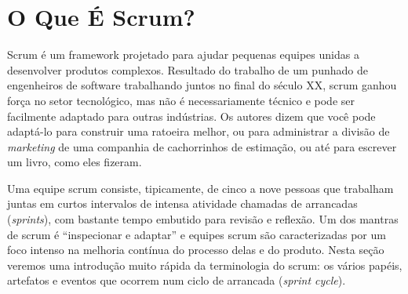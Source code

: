 \section{O Que É Scrum?}
Scrum é um framework projetado para ajudar pequenas equipes unidas a desenvolver produtos complexos. Resultado do trabalho de um punhado de engenheiros de software trabalhando juntos no final do século XX, scrum ganhou força no setor tecnológico, mas não é necessariamente técnico e pode ser facilmente adaptado para outras indústrias. Os autores  dizem que você pode adaptá-lo para construir uma ratoeira melhor, ou para administrar a divisão de \textit{marketing} de uma companhia de cachorrinhos de estimação, ou até para escrever um livro, como eles fizeram.

Uma equipe scrum consiste, tipicamente, de cinco a nove pessoas que trabalham juntas em curtos intervalos de intensa atividade chamadas de arrancadas (\emph{sprints}), com bastante tempo embutido para revisão e reflexão. Um dos mantras de scrum é ``inspecionar e adaptar'' e equipes scrum são caracterizadas por um foco intenso  na melhoria contínua do processo delas e do produto. Nesta seção veremos uma introdução muito rápida da terminologia do scrum: os vários papéis, artefatos e eventos que ocorrem num ciclo de arrancada (\emph{sprint cycle}).


